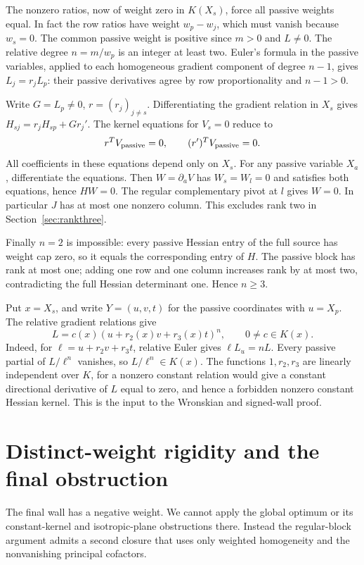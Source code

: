 \documentclass[11pt,a4paper]{article}
\begin{document}
The nonzero ratios, now of weight zero in $K(X_s)$, force all passive weights equal. In fact the row ratios have weight $w_p-w_j$, which must vanish because $w_s=0$. The common passive weight is positive since $m>0$ and $L\ne0$. The relative degree $n=m/w_p$ is an integer at least two. Euler's formula in the passive variables, applied to each homogeneous gradient component of degree $n-1$, gives $L_j=r_j L_p$: their passive derivatives agree by row proportionality and $n-1>0$. 

Write $G=L_p\ne0$, $r=(r_j)_{j\ne s}$. Differentiating the gradient relation in $X_s$ gives $H_{sj}=r_jH_{sp}+G r_j'$. The kernel equations for $V_s=0$ reduce to
\[
 r^TV_{\rm passive}=0,\qquad (r')^TV_{\rm passive}=0.
\]
All coefficients in these equations depend only on $X_s$. For any passive variable $X_a$, differentiate the equations. Then $W=\partial_a V$ has $W_s=W_l=0$ and satisfies both equations, hence $HW=0$. The regular complementary pivot at $l$ gives $W=0$. In particular $J$ has at most one nonzero column. This excludes rank two in Section~\ref{sec:rankthree}.

Finally $n=2$ is impossible: every passive Hessian entry of the full source has weight cap zero, so it equals the corresponding entry of $H$. The passive block has rank at most one; adding one row and one column increases rank by at most two, contradicting the full Hessian determinant one. Hence $n\ge3$.

Put $x=X_s$, and write $Y=(u,v,t)$ for the passive coordinates with $u=X_p$. The relative gradient relations give
\begin{equation}\label{eq:purepower}
 L=c(x)(u+r_2(x)v+r_3(x)t)^n,\qquad 0\ne c\in K(x).
\end{equation}
Indeed, for $\ell=u+r_2v+r_3t$, relative Euler gives $\ell L_u=nL$. Every passive partial of $L/\ell^n$ vanishes, so $L/\ell^n\in K(x)$. The functions $1,r_2,r_3$ are linearly independent over $K$, for a nonzero constant relation would give a constant directional derivative of $L$ equal to zero, and hence a forbidden nonzero constant Hessian kernel. This is the input to the Wronskian and signed-wall proof.


\section{Distinct-weight rigidity and the final obstruction}\label{sec:wall}
The final wall has a negative weight. We cannot apply the global optimum or its constant-kernel and isotropic-plane obstructions there. Instead the regular-block argument admits a second closure that uses only weighted homogeneity and the nonvanishing principal cofactors.
\end{document}
